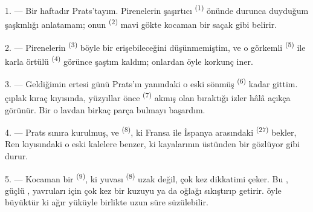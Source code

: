 
\VUsaut{4.0mm}
\VUsaut{3.0mm}

\VUsaut{3.0mm}

\VUsaut{3.0mm}

1. --- Bir haftadır Prats'tayım. Pirenelerin şaşırtıcı 
\textsuperscript{(1)} önünde durunca duyduğum şaşkınlığı anlatamam; onun
 \textsuperscript{(2)} mavi gökte kocaman bir saçak gibi
belirir.

2. --- Pirenelerin  \textsuperscript{(3)} böyle bir
 erişebileceğini düşünmemiştim, ve o görkemli
 \textsuperscript{(5)} ile karla örtülü 
\textsuperscript{(4)} görünce şaştım kaldım; onlardan öyle korkunç
 iner.

\VUsaut{3.0mm}
\VUsaut{3.0mm}

3. --- Geldiğimin ertesi günü Prats'ın yanındaki o eski sönmüş
 \textsuperscript{(6)} kadar gittim.  çıplak
kıraç kıyısında, yüzyıllar önce  \textsuperscript{(7)}
akmış olan  bıraktığı izler hâlâ açıkça görünür. Bir
 o lavdan birkaç parça bulmayı başardım.

4. --- Prats sınıra kurulmuş, ve  \textsuperscript{(8)}, ki
Fransa ile İspanya arasındaki  \textsuperscript{(27)} bekler,
Ren kıyısındaki o eski kalelere benzer, ki kayalarının
üstünden bir  gözlüyor gibi durur.

5. --- Kocaman bir  \textsuperscript{(9)}, ki yuvası
 \textsuperscript{(8)} uzak değil, çok kez dikkatimi çeker.
Bu , güçlü , yavruları için çok kez bir
kuzuyu ya da oğlağı  sıkıştırıp getirir.
 öyle büyüktür ki ağır yüküyle birlikte uzun süre süzülebilir.

